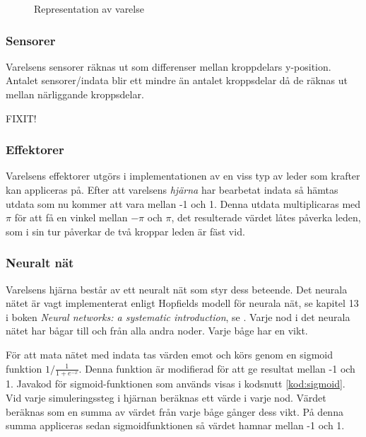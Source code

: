 \documentclass[titlepage, twocolumn, a4paper, 12pt]{article}
\begin{document}
\begin{figure}[H]
  \begin{center}
    \caption{Representation av varelse}
    \label{fig:creature.pdf}
  \end{center}
\end{figure}

\subsubsection{Sensorer}
Varelsens sensorer räknas ut som differenser mellan kroppdelars y-position. Antalet sensorer/indata blir ett mindre än antalet kroppsdelar då de räknas ut mellan närliggande kroppsdelar.

FIXIT!


        

\subsubsection{Effektorer}
Varelsens effektorer utgörs i implementationen av en viss typ av leder som krafter kan appliceras på. Efter att varelsens \textit{hjärna} har bearbetat indata så hämtas utdata som nu kommer att vara mellan -1 och 1. Denna utdata multiplicaras med $\pi$ för att få en vinkel mellan $-\pi$ och $\pi$, det resulterade värdet låtes påverka leden, som i sin tur påverkar de två kroppar leden är fäst vid.

\subsubsection{Neuralt nät}
Varelsens hjärna består av ett neuralt nät som styr dess beteende. Det neurala nätet är vagt implementerat enligt Hopfields modell för neurala nät, se kapitel 13 i boken \textit{Neural networks: a systematic introduction}, se \cite{raul}. Varje nod i det neurala nätet har bågar till och från alla andra noder. Varje båge har en vikt.

För att mata nätet med indata tas värden emot och körs genom en sigmoid funktion $1/\frac{1}{1 + e^{-x}}$. Denna funktion är modifierad för att ge resultat mellan -1 och 1. Javakod för sigmoid-funktionen som används visas i kodsnutt \ref{kod:sigmoid}. Vid varje simuleringssteg i hjärnan beräknas ett värde i varje nod. Värdet beräknas som en summa av värdet från varje båge gånger dess vikt. På denna summa appliceras sedan sigmoidfunktionen så värdet hamnar mellan -1 och 1.
\end{document}
